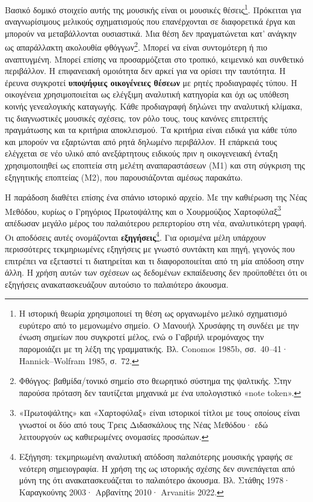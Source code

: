 \documentclass[11pt,a4paper]{article}
\begin{document}
Βασικό δομικό στοιχείο αυτής της μουσικής είναι οι μουσικές θέσεις\footnote{Η ιστορική θεωρία χρησιμοποιεί τη θέση ως οργανωμένο μελικό σχηματισμό ευρύτερο από το μεμονωμένο σημείο. Ο Μανουήλ Χρυσάφης τη συνδέει με την ένωση σημείων που συγκροτεί μέλος, ενώ ο Γαβριήλ ιερομόναχος την παρομοιάζει με τη λέξη της γραμματικής. Βλ. Conomos 1985b, σσ.~40--41· Hannick--Wolfram 1985, σ.~72.}. Πρόκειται για αναγνωρίσιμους μελικούς σχηματισμούς που επανέρχονται σε διαφορετικά έργα και μπορούν να μεταβάλλονται ουσιαστικά. Μια θέση δεν πραγματώνεται κατ' ανάγκην ως απαράλλακτη ακολουθία φθόγγων\footnote{Φθόγγος: βαθμίδα/τονικό σημείο στο θεωρητικό σύστημα της ψαλτικής. Στην παρούσα πρόταση δεν ταυτίζεται μηχανικά με ένα υπολογιστικό «note token».}. Μπορεί να είναι συντομότερη ή πιο αναπτυγμένη. Μπορεί επίσης να προσαρμόζεται στο τροπικό, κειμενικό και συνθετικό περιβάλλον. Η επιφανειακή ομοιότητα δεν αρκεί για να ορίσει την ταυτότητα. Η έρευνα συγκροτεί \textbf{υποψήφιες οικογένειες θέσεων} με ρητές προδιαγραφές τύπου. Η οικογένεια χρησιμοποιείται ως ελέγξιμη αναλυτική κατηγορία και όχι ως υπόθεση κοινής γενεαλογικής καταγωγής. Κάθε προδιαγραφή δηλώνει την αναλυτική κλίμακα, τις διαγνωστικές μουσικές σχέσεις, τον ρόλο τους, τους κανόνες επιτρεπτής πραγμάτωσης και τα κριτήρια αποκλεισμού. Τα κριτήρια είναι ειδικά για κάθε τύπο και μπορούν να εξαρτώνται από ρητά δηλωμένο περιβάλλον. Η επάρκειά τους ελέγχεται σε νέο υλικό από ανεξάρτητους ειδικούς πριν η οικογενειακή ένταξη χρησιμοποιηθεί ως εποπτεία στη μελέτη αναπαραστάσεων (M1) και στη σύγκριση της εξηγητικής εποπτείας (M2), που παρουσιάζονται αμέσως παρακάτω.

Η παράδοση διαθέτει επίσης ένα σπάνιο ιστορικό αρχείο. Με την καθιέρωση της Νέας Μεθόδου, κυρίως ο Γρηγόριος Πρωτοψάλτης και ο Χουρμούζιος Χαρτοφύλαξ\footnote{«Πρωτοψάλτης» και «Χαρτοφύλαξ» είναι ιστορικοί τίτλοι με τους οποίους είναι γνωστοί οι δύο από τους Τρεις Διδασκάλους της Νέας Μεθόδου· εδώ λειτουργούν ως καθιερωμένες ονομασίες προσώπων.} απέδωσαν μεγάλο μέρος του παλαιότερου ρεπερτορίου στη νέα, αναλυτικότερη γραφή. Οι αποδόσεις αυτές ονομάζονται \textbf{εξηγήσεις}\footnote{Εξήγηση: τεκμηριωμένη αναλυτική απόδοση παλαιότερης μουσικής γραφής σε νεότερη σημειογραφία. Η χρήση της ως ιστορικής σχέσης δεν συνεπάγεται από μόνη της ότι ανακατασκευάζεται το παλαιότερο άκουσμα. Βλ. Στάθης 1978· Καραγκούνης 2003· Αρβανίτης 2010· Arvanitis 2022.}. Για ορισμένα μέλη υπάρχουν περισσότερες τεκμηριωμένες εξηγήσεις με γνωστό συντάκτη και πηγή, γεγονός που επιτρέπει να εξεταστεί τι διατηρείται και τι διαφοροποιείται από τη μία απόδοση στην άλλη. Η χρήση αυτών των σχέσεων ως δεδομένων εκπαίδευσης δεν προϋποθέτει ότι οι εξηγήσεις ανακατασκευάζουν αυτούσιο το παλαιότερο άκουσμα.
\end{document}
